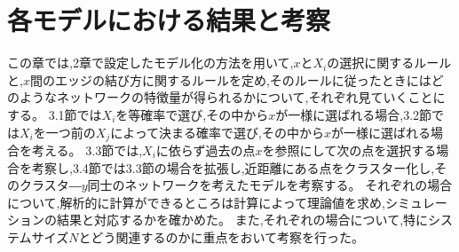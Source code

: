 \chapter{各モデルにおける結果と考察}

この章では,2章で設定したモデル化の方法を用いて,$x$と$X_{i}$の選択に関するルールと,$x$間のエッジの結び方に関するルールを定め,そのルールに従ったときにはどのようなネットワークの特徴量が得られるかについて,それぞれ見ていくことにする。
3.1節では$X_{i}$を等確率で選び,その中から$x$が一様に選ばれる場合,3.2節では$X_{i}$を一つ前の$X_{j}$によって決まる確率で選び,その中から$x$が一様に選ばれる場合を考える。
3.3節では,$X_{i}$に依らず過去の点$x$を参照にして次の点を選択する場合を考察し,3.4節では3.3節の場合を拡張し,近距離にある点をクラスター化し,そのクラスタ―$y$同士のネットワークを考えたモデルを考察する。
それぞれの場合について,解析的に計算ができるところは計算によって理論値を求め,シミュレーションの結果と対応するかを確かめた。
また,それぞれの場合について,特にシステムサイズ$N$とどう関連するのかに重点をおいて考察を行った。








